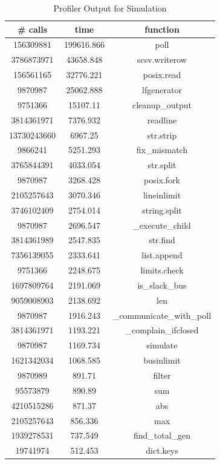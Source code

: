 \documentclass[a4paper,oneside,12pt]{report}
\begin{document}
\begin{table}[htbp]
\caption{Profiler Output for Simulation }
\label{table_profile_sim}
\centering
\begin{tabular}{c||c||c}
\bfseries \# calls & \bfseries time  & \bfseries function  \\ 
\hline \hline
156309881  &  199616.866  &  poll  \\ 
3786873971  &  43658.848  &  scsv.writerow  \\ 
156561165  &  32776.221  &  posix.read  \\ 
9870987  &  25062.888  &  lfgenerator  \\ 
9751366  &  15107.11  &  cleanup\_output  \\ 
3814361971  &  7376.932  &  readline  \\ 
13730243660  &  6967.25  &  str.strip  \\ 
9866241  &  5251.293  &  fix\_mismatch  \\ 
3765844391  &  4033.054  &  str.split  \\ 
9870987  &  3268.428  &  posix.fork  \\ 
2105257643  &  3070.346  &  lineinlimit  \\ 
3746102409  &  2754.014  &  string.split  \\ 
9870987  &  2696.547  &  \_execute\_child  \\ 
3814361989  &  2547.835  &  str.find  \\ 
7356139055  &  2333.641  &  list.append  \\ 
9751366  &  2248.675  &  limits.check  \\ 
1697809764  &  2191.069  &  is\_slack\_bus  \\ 
9059008903  &  2138.692  &  len  \\ 
9870987  &  1916.243  &  \_communicate\_with\_poll  \\ 
3814361971  &  1193.221  &  \_complain\_ifclosed  \\ 
9870987  &  1169.734  &  simulate  \\ 
1621342034  &  1068.585  &  businlimit  \\ 
9870989  &  891.71  &  filter  \\ 
95573879  &  890.89  &  sum  \\ 
4210515286  &  871.37  &  abs  \\ 
2105257643  &  856.336  &  max  \\ 
1939278531  &  737.549  &  find\_total\_gen  \\ 
19741974  &  512.453  &  dict.keys  \\ 

\end{tabular}
\end{table}
\end{document}
